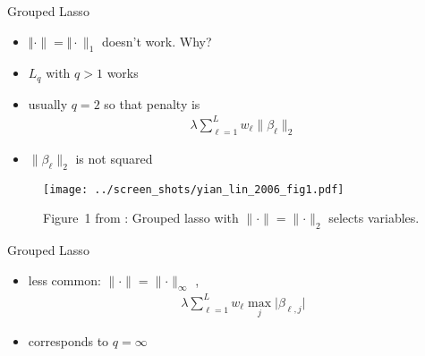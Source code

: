 \documentclass[xcolor=dvipsnames, handout]{beamer}
\begin{document}
\begin{frame}{Grouped Lasso}
  \begin{itemize}[<+->]
    \item $\Vert \cdot \rVert = \Vert \cdot \rVert_1$ doesn't work. Why?
    \item $L_q$ with $q > 1$ works 
    \item usually $q = 2$ so that penalty is 
    \begin{align*}
      \lambda \sum_{\ell = 1}^L w_\ell \lVert{\beta_{\ell}}\rVert_2
    \end{align*}
    \item $\lVert{\beta_{\ell}}\rVert_2$ is not squared
  \end{itemize}
\end{frame}


\begin{frame}{}
\begin{figure}
  \texttt{[image: ../screen\_shots/yian\_lin\_2006\_fig1.pdf]}
   \caption{Figure~1 from \textcite{yuan2006model}: Grouped lasso with $\lVert \cdot \rVert = \lVert \cdot \rVert_2$ selects variables.}
\end{figure}
\end{frame}

\begin{frame}{Grouped Lasso}
\begin{itemize}
    \item less common: $\lVert\cdot\rVert = \lVert\cdot\rVert_{\infty}$ \parencite{turlach2005simultaneous}, 
    \begin{align*}
      \lambda \sum_{\ell = 1}^L w_\ell \max_{j} \lvert{\beta_{\ell,j}}\rvert
    \end{align*}
    \item corresponds to $q = \infty$
\end{itemize}
\end{frame}
\end{document}
